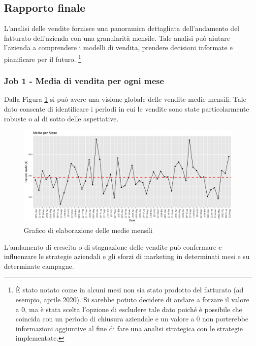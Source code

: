 \subsection{Rapporto finale}
L'analisi delle vendite fornisce una panoramica dettagliata dell'andamento del fatturato dell'azienda con una granularità mensile. Tale analisi può aiutare l'azienda a comprendere i modelli di vendita, prendere decisioni informate e pianificare per il futuro. \footnote{È stato notato come in alcuni mesi non sia stato prodotto del fatturato (ad esempio, aprile 2020). Si sarebbe potuto decidere di andare a forzare il valore a 0, ma è stata scelta l'opzione di escludere tale dato poiché è possibile che coincida con un periodo di chiusura aziendale e un valore a 0 non porterebbe informazioni aggiuntive al fine di fare una analisi strategica con le strategie implementate.}
\subsubsection{Job 1 - Media di vendita per ogni mese}
Dalla Figura \ref{figure:medie} si può avere una visione globale delle vendite medie mensili. Tale dato consente di identificare i periodi in cui le vendite sono state particolarmente robuste o al di sotto delle aspettative.
\begin{figure}[H]
    \centering
    \includegraphics[scale=.3]{img/medie.png}
    \caption{Grafico di elaborazione delle medie mensili}
    \label{figure:medie}
\end{figure}
L'andamento di crescita o di stagnazione delle vendite può confermare e influenzare le strategie aziendali e gli sforzi di marketing in determinati mesi e su determinate campagne.
